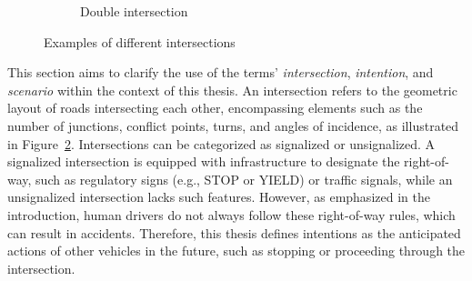 \begin{figure}[h]
\begin{subfigure}[t]{0.48\columnwidth}
		\label{fig:double_intersection}

		\caption{Double intersection}
	\end{subfigure}

	\caption{Examples of different intersections}
	\label{fig:example_intersections}
\end{figure}
This section aims to clarify the use of the terms' \textit{intersection}, \textit{intention}, and \textit{scenario} within the context of this thesis.
An intersection refers to the geometric layout of roads intersecting each other, encompassing elements such as the number of junctions, conflict points, turns, and angles of incidence, as illustrated in Figure~\ref{fig:example_intersections}. 
Intersections can be categorized as signalized or unsignalized. A signalized intersection is equipped with infrastructure to designate the right-of-way, such as regulatory signs (e.g., STOP or YIELD) or traffic signals, while an unsignalized intersection lacks such features. However, as emphasized in the introduction, human drivers do not always follow these right-of-way rules, which can result in accidents. Therefore, this thesis defines intentions as the anticipated actions of other vehicles in the future, such as stopping or proceeding through the intersection.


